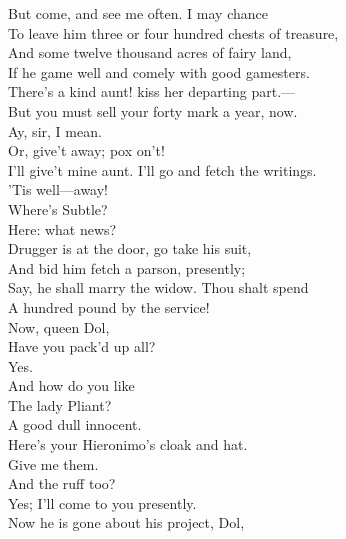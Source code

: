 \documentclass[a4paper,oneside]{memoir}
\begin{document}
\begin{drama*}
But come, and see me often. I may chance\\
To leave him three or four hundred chests of treasure,\\
And some twelve thousand acres of fairy land,\\
If he game well and comely with good gamesters.\\
\subtlespeaks There's a kind aunt! kiss her departing part.---\\
But you must sell your forty mark a year, now.\\
\dapperspeaks Ay, sir, I mean.\\
\subtlespeaks {} Or, give't away; pox on't!\\
\dapperspeaks I'll give't mine aunt. I'll go and fetch the writings.\\
\subtlespeaks 'Tis well---away!\\
\facespeaks {} Where's Subtle?\\
\subtlespeaks {} Here: what news?\\
\facespeaks Drugger is at the door, go take his suit,\\
And bid him fetch a parson, presently;\\
Say, he shall marry the widow. Thou shalt spend\\
A hundred pound by the service!\\
 Now, queen Dol,\\
Have you pack'd up all?\\
\dolspeaks {} Yes.\\
\facespeaks {} And how do you like\\
The lady Pliant?\\
\dolspeaks {} A good dull innocent.\\
\subtlespeaks Here's your Hieronimo's cloak and hat.\\
\facespeaks {} Give me them.\\
\subtlespeaks And the ruff too?\\
\facespeaks {} Yes; I'll come to you presently.\\
\subtlespeaks Now he is gone about his project, Dol,\\

\end{drama*}
\end{document}

